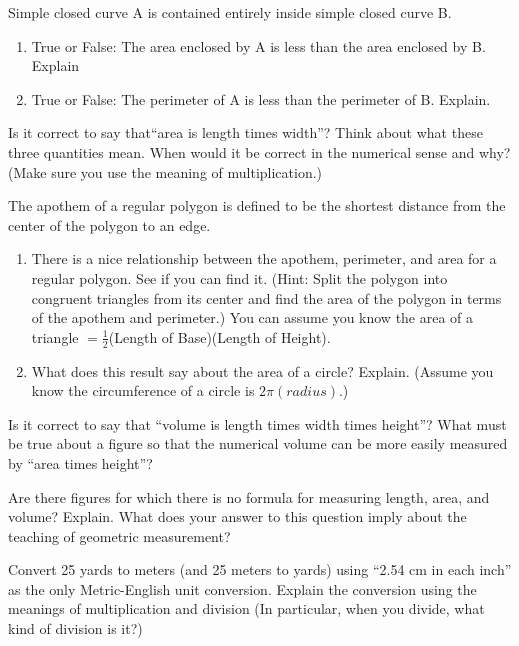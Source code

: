 \begin{prob}Simple closed curve A is contained entirely inside simple closed curve B.  
\begin{enumerate}
\item True or False:  The area enclosed by A is less than the area enclosed by B. Explain
\item True or False:  The perimeter of A is less than the perimeter of B. Explain.  
\end{enumerate}
\end{prob}

\begin{prob}
Is it correct to say that``area is length times width''?  Think about what these three quantities mean.  When would it be correct in the numerical sense and why?  (Make sure you use the meaning of multiplication.)   
\end{prob}

\begin{prob}
The apothem of a regular polygon is defined to be the shortest distance from the center of the polygon to an edge.
\begin{enumerate}
\item There is a nice relationship between the apothem, perimeter, and area for a regular polygon.  See if you can find it. (Hint:  Split the polygon into congruent triangles from its center and find the area of the polygon in terms of the apothem and perimeter.)  You can assume you know the area of a triangle $=\frac{1}{2}$(Length of Base)(Length of Height).
\item What does this result say about the area of a circle?  Explain. (Assume you know the circumference of a circle is $2\pi(radius)$.)
\end{enumerate}
\end{prob}

\begin{prob}
 Is it correct to say that ``volume is length times width times height''? What must be true about a figure so that the numerical volume can be more easily measured by ``area times height''?
\end{prob}

\begin{prob}
Are there figures for which there is no formula for measuring length, area, and volume?  Explain.  What does your answer to this question imply about the teaching of geometric measurement?
\end{prob}

\begin{prob}
Convert 25 yards to meters (and 25 meters to yards) using ``2.54 cm in each inch'' as the only Metric-English unit conversion.  Explain the conversion using the meanings of multiplication and division (In particular, when you divide, what kind of division is it?)
\end{prob}

